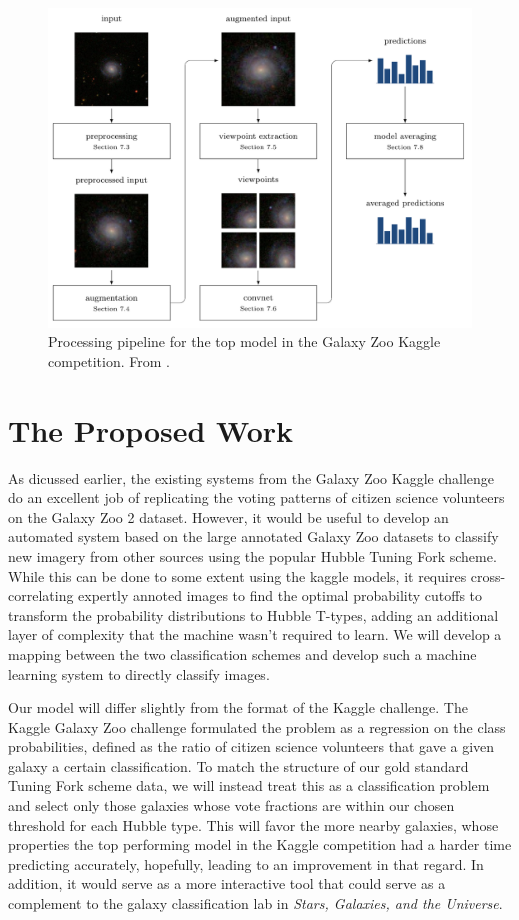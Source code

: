 \documentclass{article}
\begin{document}
\begin{figure}[h]
  \centering
	\includegraphics[width=130mm]{../img/GZ2_network.png}
  \caption{Processing pipeline for the top model in the Galaxy Zoo Kaggle competition. From \cite{2015MNRAS.450.1441D}.}
  \label{fig:GZ2_network}
\end{figure}




\section{The Proposed Work}
As dicussed earlier, the existing systems from the Galaxy Zoo Kaggle challenge do an excellent job of replicating the voting patterns of citizen science volunteers on the Galaxy Zoo 2 dataset. However, it would be useful to develop an automated system based on the large annotated Galaxy Zoo datasets to classify new imagery from other sources using the popular Hubble Tuning Fork scheme. While this can be done to some extent using the kaggle models, it requires cross-correlating expertly annoted images to find the optimal probability cutoffs to transform the probability distributions to Hubble T-types, adding an additional layer of complexity that the machine wasn't required to learn. We will develop a mapping between the two classification schemes and develop such a machine learning system to directly classify images. 

Our model will differ slightly from the format of the Kaggle challenge. The Kaggle Galaxy Zoo challenge formulated the problem as a regression on the class probabilities, defined as the ratio of citizen science volunteers that gave a given galaxy a certain classification. To match the structure of our gold standard Tuning Fork scheme data, we will instead treat this as a classification problem and select only those galaxies whose vote fractions are within our chosen threshold for each Hubble type. This will favor the more nearby galaxies, whose properties the top performing model in the Kaggle competition had a harder time predicting accurately, hopefully, leading to an improvement in that regard. In addition, it would serve as a more interactive tool that could serve as a complement to the galaxy classification lab in \emph{Stars, Galaxies, and the Universe}.
\end{document}
